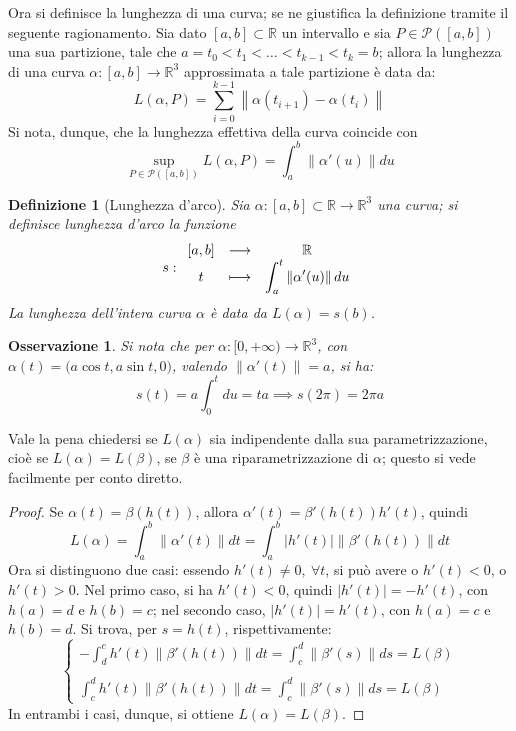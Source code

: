 \documentclass[12pt]{article}
\theoremstyle{style}
\newtheorem{definizione}{Definizione}[section]
\newtheorem{osservazione}{Osservazione}[section]
\numberwithin{equation}{subsection}
\begin{document}
Ora si definisce la lunghezza di una curva; se ne giustifica la definizione tramite il seguente ragionamento.
Sia dato $[a,b] \subset \mathbb{R}$ un intervallo e sia $P \in \mathcal{P} ([a,b])$ una sua partizione, tale che $a = t_0 < t_1 < \ldots<t_{k-1} <t_k = b$; allora la lunghezza di una curva $\alpha  : [a,b] \to \mathbb{R}^3$ approssimata a tale partizione \`e data da:
\begin{equation}
	L(\alpha , P) = \sum_{i=0}^{k-1} \left\lVert \alpha (t_{i+1}) - \alpha (t_i) \right\rVert 
\end{equation}
Si nota, dunque, che la lunghezza effettiva della curva coincide con
\begin{equation}
	\sup_{P \in \mathcal{P}([a,b]) } L(\alpha ,P) = \int_{a} ^b \left\lVert \alpha' (u) \right\rVert du
\end{equation}
\begin{definizione}
	[Lunghezza d'arco]
	Sia $\alpha  : [a,b] \subset \mathbb{R}\to \mathbb{R}^3$ una curva; si definisce \textit{lunghezza d'arco} la funzione
	\[
	s :
	\begin{array}
		{c c c}
		[a,b] & \longrightarrow &\mathbb{R}\\
		t & \longmapsto &\displaystyle  \int_{a} ^t \left\lVert \alpha '(u) \right\rVert du
	\end{array}
	\] 
	La lunghezza dell'intera curva $\alpha $ \`e data da $L(\alpha ) = s(b)$.
\end{definizione}
\begin{osservazione}
Si nota che per $\alpha : [0,+\infty) \to \mathbb{R}^3$, con $\alpha  (t) = \big(a \cos t, a \sin t, 0\big)$, valendo $\left\lVert \alpha '(t) \right\rVert = a$, si ha:
\[
s(t) = a \int_{0} ^t du = ta \implies s (2\pi) = 2\pi a
\] 
\end{osservazione}
\noindent Vale la pena chiedersi se $L(\alpha )$ sia indipendente dalla sua parametrizzazione, cio\`e se $L(\alpha ) = L(\beta )$, se $\beta $ \`e una riparametrizzazione di $\alpha $; questo si vede facilmente per conto diretto.
\begin{proof}
	Se $\alpha (t) = \beta (h(t))$, allora $\alpha '(t) = \beta '(h(t)) h'(t)$, quindi
	\[
	L(\alpha ) = \int_{a} ^b \left\lVert \alpha '(t) \right\rVert dt = \int_{a} ^b \lvert h'(t) \rvert \left\lVert \beta '(h(t)) \right\rVert dt
	\] 
	Ora si distinguono due casi: essendo $h'(t)\neq 0, \ \forall t$, si pu\`o avere o $h'(t) <0$, o $h'(t) > 0$. 
	Nel primo caso, si ha $h'(t) < 0$, quindi $\lvert h'(t) \rvert = - h'(t)$, con $h(a) = d$ e $h(b) = c$; nel secondo caso, $\lvert h'(t) \rvert =h'(t)$, con $h(a) = c$ e $h(b) = d$.
	Si trova, per $s = h(t)$, rispettivamente:
	\[
	\begin{cases}
		\displaystyle -\int_{d} ^c h'(t) \left\lVert \beta '(h(t))  \right\rVert dt = \int_{c} ^d \left\lVert \beta '(s) \right\rVert ds = L(\beta )\\
		\\
		\displaystyle \int_{c} ^d h'(t) \left\lVert \beta '(h(t)) \right\rVert dt = \int_{c} ^d \left\lVert \beta '(s) \right\rVert ds = L(\beta )
	\end{cases}
	\] 
In entrambi i casi, dunque, si ottiene $L(\alpha ) = L(\beta )$.	
\end{proof}
\end{document}
